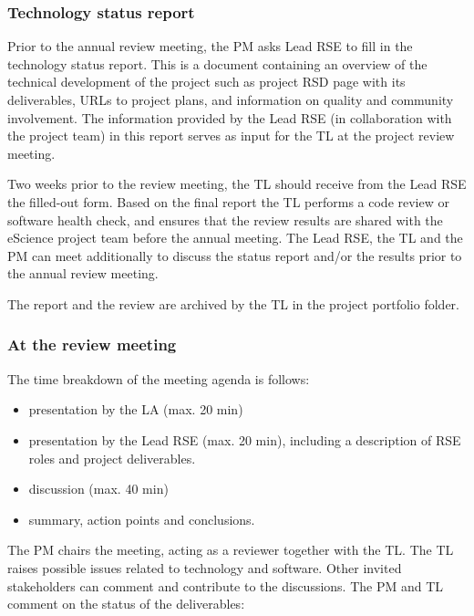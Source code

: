 \subsubsection{Technology status report}
\label{sec:exec:tech}
Prior to the annual review meeting, the PM asks Lead RSE to fill in the technology status report. This is a document
containing an overview of the technical development of the project such as project RSD page with its deliverables, URLs
to project plans, and information on quality and community involvement. The information provided by the Lead RSE (in
collaboration with the project team) in this report serves as input for the TL at the project review meeting.

Two weeks prior to the review meeting, the TL should receive from the Lead RSE the filled-out
form. Based on the final report the TL performs a code review or software health check, and ensures that the review
results are shared with the eScience project team before the annual meeting. The Lead RSE, the TL and the PM can meet
additionally to discuss the status report and/or the results prior to the annual review meeting.

The report and the review are archived by the TL in the project portfolio folder.

\subsubsection{At the review meeting}
The time breakdown of the meeting agenda is follows:
\begin{itemize}
\item presentation by the LA (max. 20 min)
\item presentation by the Lead RSE (max. 20 min), including a description of RSE roles and project deliverables.
\item discussion (max. 40 min)
\item summary, action points and conclusions.
\end{itemize}

The PM chairs the meeting, acting as a reviewer together with the TL. The TL raises possible issues related to
technology and software. Other invited stakeholders can comment and contribute to the discussions. The PM and TL
comment on the status of the deliverables:

